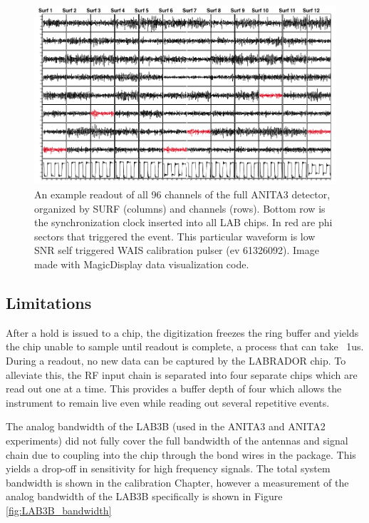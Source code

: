 		
\begin{figure}
\centering
	\includegraphics[width=\textwidth]{figures/waveformSnapshot}
	\caption{An example readout of all 96 channels of the full ANITA3 detector, organized by SURF (columns) and channels (rows).  Bottom row is the synchronization clock inserted into all LAB chips.  In red are phi sectors that triggered the event.  This particular waveform is low SNR self triggered WAIS calibration pulser (ev 61326092).  Image made with MagicDisplay data visualization code.}
	\label{fig:waveformSnapshot}
\end{figure}
		
	
	
	\subsection{Limitations}
	After a hold is issued to a chip, the digitization freezes the ring buffer and yields the chip unable to sample until readout is complete, a process that can take ~1us.  During a readout, no new data can be captured by the LABRADOR chip.  To alleviate this, the RF input chain is separated into four separate chips which are read out one at a time.  This provides a buffer depth of four which allows the instrument to remain live even while reading out several repetitive events.
	
	The analog bandwidth of the LAB3B (used in the ANITA3 and ANITA2 experiments) did not fully cover the full bandwidth of the antennas and signal chain due to coupling into the chip through the bond wires in the package.  This yields a drop-off in sensitivity for high frequency signals.    The total system bandwidth is shown in the calibration Chapter, however a measurement of the analog bandwidth of the LAB3B specifically is shown in Figure \ref{fig:LAB3B_bandwidth}
	
